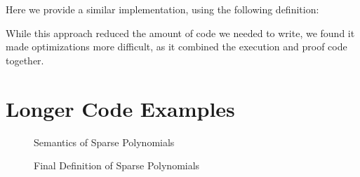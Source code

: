 \documentclass[draft, twocolumn]{article}
\theoremstyle{definition}
\theoremstyle{definition}
\begin{document}
Here we provide a similar implementation, using the following definition:

While this approach reduced the amount of code we needed to write, we found it
made optimizations more difficult, as it combined the execution and proof code
together.


\newpage
\appendix
\section{Longer Code Examples}
\begin{figure}[h]
  \caption{Semantics of Sparse Polynomials}
  \label{semantics}
\end{figure}
\begin{figure}[h]
  \caption{Final Definition of Sparse Polynomials}
  \label{final-poly-def}
\end{figure}
\end{document}
